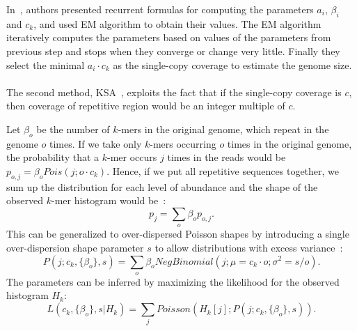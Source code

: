 %

In~\cite{waterman}, authors presented recurrent formulas for computing the parameters $a_i,\, \beta_i$ and $c_k$, and used EM algorithm to obtain their values. The EM algorithm iteratively computes the parameters based on values of the parameters from previous step and stops when they converge or change very little. Finally they select the minimal $a_i \cdot c_k$ as the single-copy coverage to estimate the genome size.

\paragraph{}The second method, KSA~\cite{williams}, exploits the fact that if the single-copy coverage is $c$, then coverage of repetitive region would be an integer multiple of $c$.

Let $\beta_o$ be the number of $k$-mers in the original genome, which repeat in the genome $o$ times.
If we take only $k$-mers occurring $o$ times in the original genome, the probability that a $k$-mer occurs $j$ times in the reads would be $p_{o,j} = \beta_o Pois(j; o \cdot c_k)$.
Hence, if we put all repetitive sequences together, we sum up the distribution for each level of abundance and the shape of the observed $k$-mer histogram would be~\cite{williams}:
$$p_j = \sum_o \beta_o p_{o,j}.$$
This can be generalized to over-dispersed Poisson shapes by introducing a single over-dispersion shape parameter $s$ to allow distributions with excess variance~\cite{williams}:
$$P(j; c_k, \{\beta_o\}, s) = \sum_o \beta_o NegBinomial(j; \mu=c_k\cdot o;\sigma^2=s/o).$$
The parameters can be inferred by maximizing the likelihood for the observed histogram $H_k$:
$$L(c_k, \{\beta_o\}, s | H_k) = \sum_j Poisson(H_k[j]; P(j; c_k, \{\beta_o\}, s)).$$

